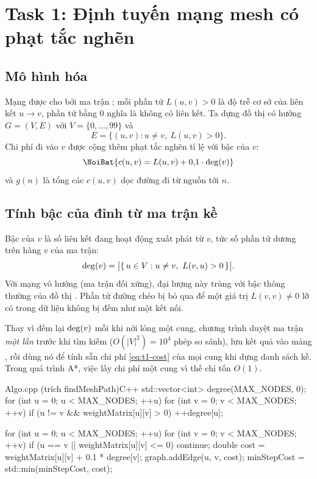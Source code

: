 \chapter{Task 1: Định tuyến mạng mesh có phạt tắc nghẽn}
\label{chap:task1}

\section{Mô hình hóa}
\label{sec:t1-mo-hinh}

Mạng được cho bởi ma trận ; mỗi phần tử $L(u, v) > 0$ là độ trễ cơ
sở của liên kết $u \to v$, phần tử bằng $0$ nghĩa là không có liên kết. Ta dựng đồ thị có hướng
$G = (V, E)$ với $V = \{0, \dots, 99\}$ và
\[
  E = \{(u, v) : u \ne v,\ L(u, v) > 0\}.
\]
Chi phí đi vào $v$ được cộng thêm phạt tắc nghẽn tỉ lệ với bậc của $v$:
\begin{equation}
  \NoiBat{c(u, v) = L(u, v) + 0{,}1 \cdot \degr(v)}
  \label{eq:t1-cost}
\end{equation}
và $g(n)$ là tổng các $c(u, v)$ dọc đường đi từ nguồn tới $n$.

\section{Tính bậc của đỉnh từ ma trận kề}
\label{sec:t1-bac}

Bậc của $v$ là số liên kết đang hoạt động xuất phát từ $v$, tức số phần tử dương trên hàng $v$
của ma trận:
\begin{equation}
  \operatorname{deg}(v) = \big|\{\, u \in V : u \ne v,\ L(v, u) > 0 \,\}\big|.
  \label{eq:t1-deg}
\end{equation}
Với mạng vô hướng (ma trận đối xứng), đại lượng này trùng với bậc thông thường của đồ thị
\cite{rosen2019}. Phần tử đường chéo bị bỏ qua để một giá trị $L(v, v) \ne 0$ lỡ có trong dữ
liệu không bị đếm như một kết nối.

Thay vì đếm lại $\operatorname{deg}(v)$ mỗi khi nới lỏng một cung, chương trình duyệt ma trận \emph{một lần}
trước khi tìm kiếm ($O(|V|^2) = 10^4$ phép so sánh), lưu kết quả vào mảng , rồi dùng
nó để tính sẵn chi phí \eqref{eq:t1-cost} của mọi cung khi dựng danh sách kề. Trong quá trình A*,
việc lấy chi phí một cung vì thế chỉ tốn $O(1)$.

\begin{khungma}{Algo.cpp (trích findMeshPath)}{C++}
std::vector<int> degree(MAX_NODES, 0);
for (int u = 0; u < MAX_NODES; ++u)
    for (int v = 0; v < MAX_NODES; ++v)
        if (u != v && weightMatrix[u][v] > 0) ++degree[u];

for (int u = 0; u < MAX_NODES; ++u)
    for (int v = 0; v < MAX_NODES; ++v) {
        if (u == v || weightMatrix[u][v] <= 0) continue;
        double cost = weightMatrix[u][v] + 0.1 * degree[v];
        graph.addEdge(u, v, cost);
        minStepCost = std::min(minStepCost, cost);
    }
\end{khungma}

